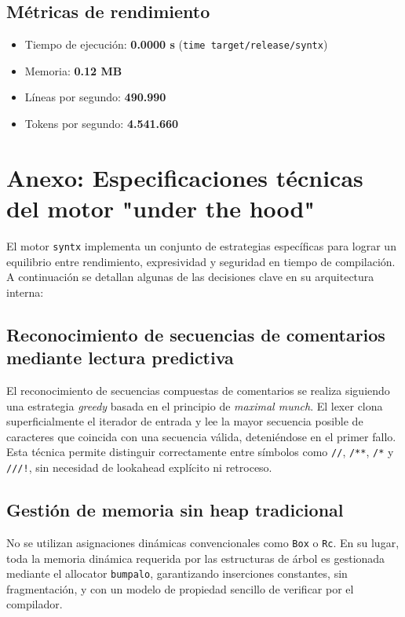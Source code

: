 \documentclass{article}
\begin{document}
\subsection*{Métricas de rendimiento}
\begin{itemize}
    \item Tiempo de ejecución: \textbf{0.0000 s} \hfill (\texttt{time target/release/syntx})
    \item Memoria: \textbf{0.12 MB}
    \item Líneas por segundo: \textbf{490.990}
    \item Tokens por segundo: \textbf{4.541.660}
\end{itemize}

\appendix
\section*{Anexo: Especificaciones técnicas del motor "under the hood"}
El motor \texttt{syntx} implementa un conjunto de estrategias específicas para lograr un equilibrio entre rendimiento, expresividad y seguridad en tiempo de compilación. A continuación se detallan algunas de las decisiones clave en su arquitectura interna:

\subsection*{Reconocimiento de secuencias de comentarios mediante lectura predictiva}

El reconocimiento de secuencias compuestas de comentarios se realiza siguiendo una estrategia \textit{greedy} basada en el principio de \textit{maximal munch}. El lexer clona superficialmente el iterador de entrada y lee la mayor secuencia posible de caracteres que coincida con una secuencia válida, deteniéndose en el primer fallo. Esta técnica permite distinguir correctamente entre símbolos como \texttt{//}, \texttt{/**}, \texttt{/*} y \texttt{///!}, sin necesidad de lookahead explícito ni retroceso.

\subsection*{Gestión de memoria sin heap tradicional}

No se utilizan asignaciones dinámicas convencionales como \texttt{Box} o \texttt{Rc}. En su lugar, toda la memoria dinámica requerida por las estructuras de árbol es gestionada mediante el allocator \texttt{bumpalo}, garantizando inserciones constantes, sin fragmentación, y con un modelo de propiedad sencillo de verificar por el compilador.
\end{document}
